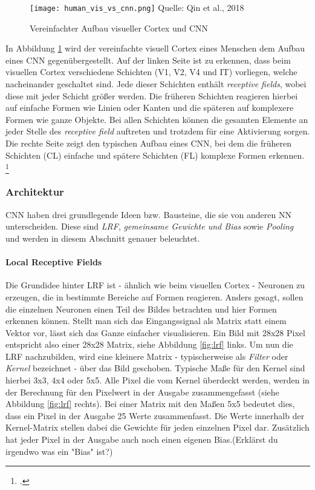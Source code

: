 
\begin{figure}[t]
    \centering
    \caption[]{Vereinfachter Aufbau visueller Cortex und \ac{CNN}}
	\label{fig:humVisVsCNN}
    \texttt{[image: human\_vis\_vs\_cnn.png]}
    Quelle: Qin et al., 2018
\end{figure}

In Abbildung \ref{fig:humVisVsCNN} wird der vereinfachte visuell Cortex eines Menschen dem Aufbau eines \ac{CNN} gegenübergestellt. Auf der linken Seite ist zu erkennen, dass beim visuellen Cortex verschiedene Schichten (V1, V2, V4 und IT) vorliegen, welche nacheinander geschaltet sind. Jede dieser Schichten enthält \textit{receptive fields}, wobei diese mit jeder Schicht größer werden. Die früheren Schichten reagieren hierbei auf einfache Formen wie Linien oder Kanten und die späteren auf komplexere Formen wie ganze Objekte. Bei allen Schichten können die gesamten Elemente an jeder Stelle des \textit{receptive field} auftreten und trotzdem für eine Aktivierung sorgen. Die rechte Seite zeigt den typischen Aufbau eines \ac{CNN}, bei dem die früheren Schichten (CL) einfache und spätere Schichten (FL) komplexe Formen erkennen. \footcite[Vgl. ][S. 6]{qinHowConvolutionalNeural2018}

\subsubsection{Architektur}
\ac{CNN} haben drei grundlegende Ideen bzw. Bausteine, die sie von anderen \ac{NN} unterscheiden. Diese sind \textit{\ac{LRF}}, \textit{gemeinsame Gewichte und Bias} sowie \textit{Pooling} und werden in diesem Abschnitt genauer beleuchtet.

\paragraph{Local Receptive Fields} \label{LocalReceptiveFields}
Die Grundidee hinter \ac{LRF} ist - ähnlich wie beim visuellen Cortex - Neuronen zu erzeugen, die in bestimmte Bereiche auf Formen reagieren. Anders gesagt, sollen die einzelnen Neuronen einen Teil des Bildes betrachten und hier Formen erkennen können. Stellt man sich das Eingangssignal als Matrix statt einem Vektor vor, lässt sich das Ganze einfacher visualisieren. Ein Bild mit 28x28 Pixel entspricht also einer 28x28 Matrix, siehe Abbildung \ref{fig:lrf} links. Um nun die \ac{LRF} nachzubilden, wird eine kleinere Matrix - typischerweise als \textit{Filter} oder \textit{Kernel} bezeichnet - über das Bild geschoben. Typische Maße für den Kernel sind hierbei 3x3, 4x4 oder 5x5. Alle Pixel die vom Kernel überdeckt werden, werden in der Berechnung für den Pixelwert in der Ausgabe zusammengefasst (siehe Abbildung \ref{fig:lrf} rechts). Bei einer Matrix mit den Maßen 5x5 bedeutet dies, dass ein Pixel in der Ausgabe 25 Werte zusammenfasst. Die Werte innerhalb der Kernel-Matrix stellen dabei die Gewichte für jeden einzelnen Pixel dar. Zusätzlich hat jeder Pixel in der Ausgabe auch noch einen eigenen Bias.(Erklärst du irgendwo was ein "Bias" ist?)

